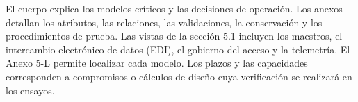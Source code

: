 El cuerpo explica los modelos críticos y las decisiones de operación. Los anexos detallan los atributos, las relaciones, las validaciones, la conservación y los procedimientos de prueba. Las vistas de la sección 5.1 incluyen los maestros, el intercambio electrónico de datos (EDI), el gobierno del acceso y la telemetría. El Anexo 5-L permite localizar cada modelo. Los plazos y las capacidades corresponden a compromisos o cálculos de diseño cuya verificación se realizará en los ensayos.
